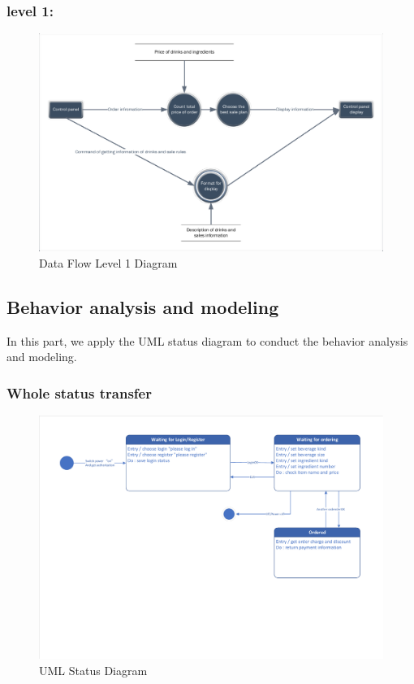 \documentclass[a4paper]{report}
\begin{document}
\subsubsection{level 1:}
\begin{figure}
  \centering
  \includegraphics[scale=0.38]{DataFlowLevel1.pdf}
  \caption{Data Flow Level 1 Diagram}\label{6}
\end{figure}

\subsection{Behavior analysis and modeling}
In this part, we apply the UML status diagram to conduct the behavior analysis and modeling.
\subsubsection{Whole status transfer}
\begin{figure}
  \centering
  \includegraphics[scale=0.38]{statusDiagramPDF.pdf}
  \caption{UML Status Diagram}\label{7}
\end{figure}
\end{document}
